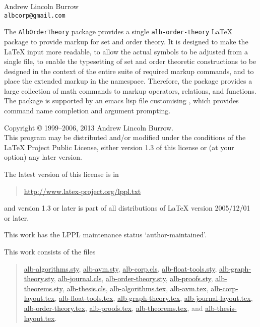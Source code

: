 \documentclass[11pt,a4paper,oneside]{alb-corp}
\begin{document}


\begin{albTitlePage}


  Andrew Lincoln Burrow\\
  \texttt{albcorp@gmail.com}



  The \texttt{AlbOrderTheory} package provides a single
  \texttt{alb-order-theory} \LaTeX{} package to provide markup for set
  and order theory.  It is designed to make the \LaTeX{} input more
  readable, to allow the actual symbols to be adjusted from a single
  file, to enable the typesetting of set and order theoretic
  constructions to be designed in the context of the entire suite of
  required markup commands, and to place the extended markup in the
  \albLogo{} namespace.  Therefore, the package provides a large
  collection of math commands to markup operators, relations, and
  functions.  The package is supported by an emacs lisp file customising
  \AUCTeX{}, which provides command name completion and argument
  prompting.



  Copyright \copyright{} 1999--2006, 2013 Andrew Lincoln Burrow.\\
  This program may be distributed and/or modified under the conditions
  of the \LaTeX{} Project Public License, either version 1.3 of this
  license or (at your option) any later version.

  \medskip{}

  The latest version of this license is in
  \begin{quote}
    \url{http://www.latex-project.org/lppl.txt}
  \end{quote}
  and version 1.3 or later is part of all distributions of LaTeX version
  2005/12/01 or later.

  \medskip{}

  This work has the LPPL maintenance status `author-maintained'.

  \medskip{}

  This work consists of the files
  \begin{quote}
    \begin{flushleft}
      \url{alb-algorithms.sty}, \url{alb-avm.sty}, \url{alb-corp.cls},
      \url{alb-float-tools.sty}, \url{alb-graph-theory.sty},
      \url{alb-journal.cls}, \url{alb-order-theory.sty},
      \url{alb-proofs.sty}, \url{alb-theorems.sty},
      \url{alb-thesis.cls}, \url{alb-algorithms.tex}, \url{alb-avm.tex},
      \url{alb-corp-layout.tex}, \url{alb-float-tools.tex},
      \url{alb-graph-theory.tex}, \url{alb-journal-layout.tex},
      \url{alb-order-theory.tex}, \url{alb-proofs.tex},
      \url{alb-theorems.tex}, and \url{alb-thesis-layout.tex}.
    \end{flushleft}
  \end{quote}



\end{albTitlePage}
\end{document}
